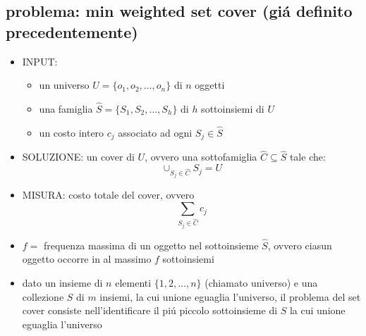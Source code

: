 
\subsection*{problema: min weighted set cover (gi\'a definito precedentemente)}
\begin{flushleft}
	\begin{itemize}
		\item INPUT:
		\begin{itemize}
			\item un universo $U=\{o_1,o_2,\ldots,o_n\}$ di $n$ oggetti
			\item una famiglia $\hat{S}=\{S_1,S_2,\ldots,S_h\}$ di $h$ sottoinsiemi di $U$
			\item un costo intero $c_j$ associato ad ogni $S_j\in \hat{S}$
		\end{itemize}
		\item SOLUZIONE: un cover di $U$, ovvero una sottofamiglia $\hat{C}\subseteq\hat{S}$ tale che:
			$$\cup_{S_j\in\hat{C}}S_j=U$$
		\item MISURA: costo totale del cover, ovvero
			$$\sum_{S_j\in\hat{C}}c_j$$
	\end{itemize}
	\vspace{0.5cm}
	\begin{itemize}
		\item $f=$ frequenza massima di un oggetto nel sottoinsieme $\hat{S}$, ovvero ciasun oggetto occorre in al massimo $f$ sottoinsiemi
		\item dato un insieme di $n$ elementi $\{1,2,\ldots,n\}$ (chiamato universo) e una collezione $S$ di $m$ insiemi, la cui unione eguaglia l'universo, il problema del set cover consiste nell'identificare il pi\'u piccolo sottoinsieme di $S$ la cui unione eguaglia l'universo
	\end{itemize}
\end{flushleft}


